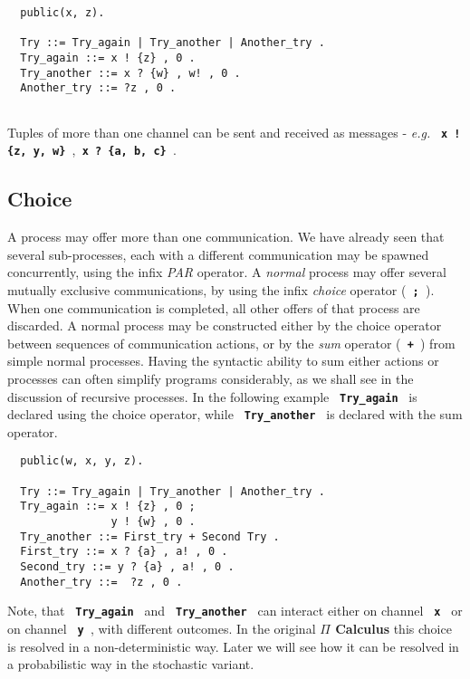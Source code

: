 \documentclass[twoside,10pt]{report}
\begin{document}
\begin{verbatim}
  public(x, z).

  Try ::= Try_again | Try_another | Another_try .
  Try_again ::= x ! {z} , 0 .
  Try_another ::= x ? {w} , w! , 0 .
  Another_try ::= ?z , 0 .
 
\end{verbatim}

\noindent
Tuples of more than one channel can be sent and received as messages -
\newline
{\em e.g.}
{\bf \verb+ x ! {z, y, w} +},{\bf \verb+ x ? {a, b, c} +}. 

\subsection{Choice}

A process may offer more than one communication.  We have already seen
that several sub-processes, each with a different communication may
be spawned concurrently, using the infix {\em PAR} operator. A
{\em normal} process may offer several mutually exclusive
communications, by using the infix {\em choice} operator ({\bf \verb+ ; +}).
When one communication is completed, all other offers of that process 
are discarded.
A normal process may be constructed either by the choice operator
between sequences of communication actions, or by the {\em sum}
operator ({\bf \verb- + -}) from simple normal processes. Having the
syntactic ability to
sum either actions or processes can often simplify programs
considerably, as we shall see in the discussion of recursive processes.
In the following example {\bf \verb+ Try_again +} is declared using the choice
operator, while {\bf \verb+ Try_another +} is declared with the sum operator.

{\samepage
\begin{verbatim}
  public(w, x, y, z).

  Try ::= Try_again | Try_another | Another_try .
  Try_again ::= x ! {z} , 0 ;
                y ! {w} , 0 .
  Try_another ::= First_try + Second Try .
  First_try ::= x ? {a} , a! , 0 .
  Second_try ::= y ? {a} , a! , 0 .
  Another_try ::=  ?z , 0 .
\end{verbatim}
}

\noindent
Note, that {\bf \verb+ Try_again +} and {\bf \verb+ Try_another +} can interact
either on channel {\bf \verb+ x +} or on channel {\bf \verb+ y +}, with
different outcomes.  In the original {\bf $\Pi$ Calculus} this choice is
resolved in a non-deterministic way.  Later we will see how it can be
resolved in a probabilistic way in the stochastic variant.
\end{document}
